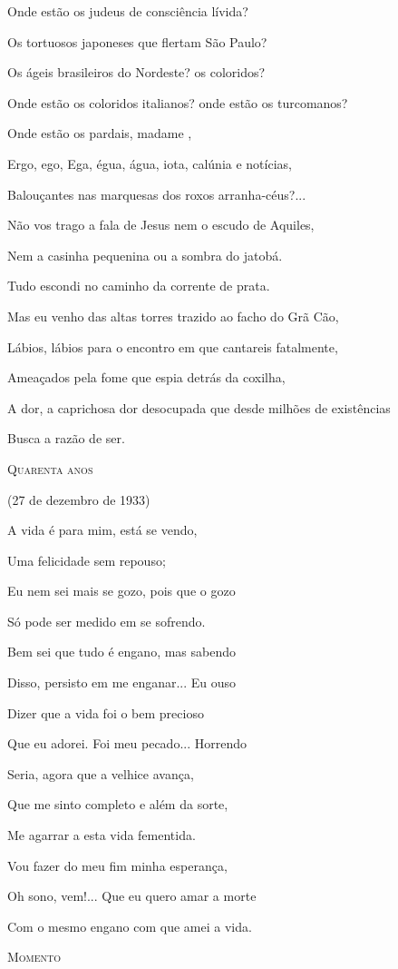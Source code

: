 Onde estão os judeus de consciência lívida?

Os tortuosos japoneses que flertam São Paulo?

Os ágeis brasileiros do Nordeste? os coloridos?

Onde estão os coloridos italianos? onde estão os turcomanos?

Onde estão os pardais, madame ,

Ergo, ego, Ega, égua, água, iota, calúnia e notícias,

Balouçantes nas marquesas dos roxos arranha-céus?...

Não vos trago a fala de Jesus nem o escudo de Aquiles,

Nem a casinha pequenina ou a sombra do jatobá.

Tudo escondi no caminho da corrente de prata.

Mas eu venho das altas torres trazido ao facho do Grã Cão,

Lábios, lábios para o encontro em que cantareis fatalmente,

Ameaçados pela fome que espia detrás da coxilha,

A dor, a caprichosa dor desocupada que desde milhões de existências

Busca a razão de ser.

\textsc{Quarenta anos}

(27 de dezembro de 1933)

A vida é para mim, está se vendo,

Uma felicidade sem repouso;

Eu nem sei mais se gozo, pois que o gozo

Só pode ser medido em se sofrendo.

Bem sei que tudo é engano, mas sabendo

Disso, persisto em me enganar... Eu ouso

Dizer que a vida foi o bem precioso

Que eu adorei. Foi meu pecado... Horrendo

Seria, agora que a velhice avança,

Que me sinto completo e além da sorte,

Me agarrar a esta vida fementida.

Vou fazer do meu fim minha esperança,

Oh sono, vem!... Que eu quero amar a morte

Com o mesmo engano com que amei a vida.

\textsc{Momento}


